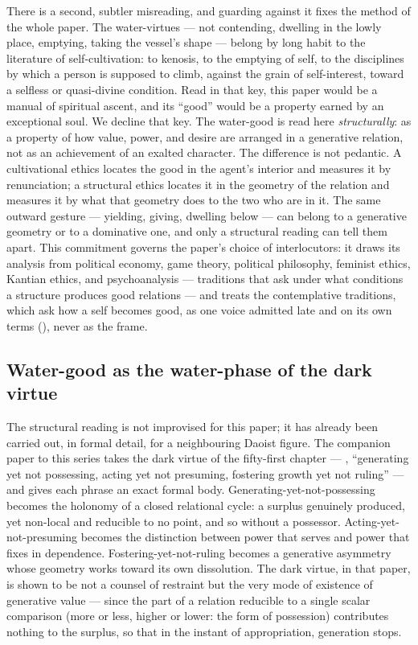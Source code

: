 There is a second, subtler misreading, and guarding against it fixes the method of the whole paper. The water-virtues --- not contending, dwelling in the lowly place, emptying, taking the vessel's shape --- belong by long habit to the literature of self-cultivation: to kenosis, to the emptying of self, to the disciplines by which a person is supposed to climb, against the grain of self-interest, toward a selfless or quasi-divine condition. Read in that key, this paper would be a manual of spiritual ascent, and its ``good'' would be a property earned by an exceptional soul. We decline that key. The water-good is read here \emph{structurally}: as a property of how value, power, and desire are arranged in a generative relation, not as an achievement of an exalted character. The difference is not pedantic. A cultivational ethics locates the good in the agent's interior and measures it by renunciation; a structural ethics locates it in the geometry of the relation and measures it by what that geometry does to the two who are in it. The same outward gesture --- yielding, giving, dwelling below --- can belong to a generative geometry or to a dominative one, and only a structural reading can tell them apart. This commitment governs the paper's choice of interlocutors: it draws its analysis from political economy, game theory, political philosophy, feminist ethics, Kantian ethics, and psychoanalysis --- traditions that ask under what conditions a structure produces good relations --- and treats the contemplative traditions, which ask how a self becomes good, as one voice admitted late and on its own terms (), never as the frame.

\subsection{Water-good as the water-phase of the dark virtue}
\label{p20:sub:intro-xuande}

The structural reading is not improvised for this paper; it has already been carried out, in formal detail, for a neighbouring Daoist figure. The companion paper to this series \parencite{wan2026braid} takes the dark virtue of the fifty-first chapter --- , ``generating yet not possessing, acting yet not presuming, fostering growth yet not ruling'' --- and gives each phrase an exact formal body. Generating-yet-not-possessing becomes the holonomy of a closed relational cycle: a surplus genuinely produced, yet non-local and reducible to no point, and so without a possessor. Acting-yet-not-presuming becomes the distinction between power that serves and power that fixes in dependence. Fostering-yet-not-ruling becomes a generative asymmetry whose geometry works toward its own dissolution. The dark virtue, in that paper, is shown to be not a counsel of restraint but the very mode of existence of generative value --- since the part of a relation reducible to a single scalar comparison (more or less, higher or lower: the form of possession) contributes nothing to the surplus, so that in the instant of appropriation, generation stops.

